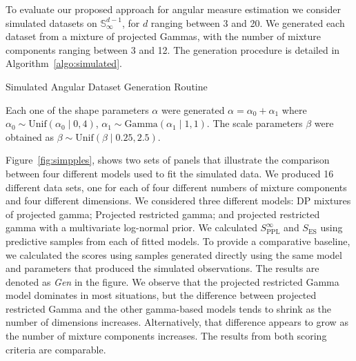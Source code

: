 To evaluate our proposed approach for angular measure estimation 
we consider simulated datasets on $\mathbb{S}_{\infty}^{d-1}$, for 
$d$ ranging between 3 and 20. We generated each dataset from a mixture of projected Gammas, with the number of mixture components
  ranging between 3 and 12.  The generation procedure is detailed in Algorithm~\ref{algo:simulated}.
  \begin{algorithm}[ht]
    \footnotesize
    \caption{Simulated Angular Dataset Generation Routine\label{algo:simulated}}
  \end{algorithm}
Each one of the shape parameters $\alpha$ were generated 
$\alpha = \alpha_0 + \alpha_1$ where
  $\alpha_0 \sim \text{Unif}(\alpha_0\mid 0,4)$, $\alpha_1\sim \text{Gamma}(\alpha_1\mid 1,1)$.
The scale parameters $\beta$ were obtained as $\beta\sim\text{Unif}(\beta\mid 0.25, 2.5)$.


Figure~\ref{fig:simpples}, shows two sets of panels that illustrate the comparison
between four different models used to fit the simulated data. We produced 16 
different data sets, one for each of four different numbers of mixture components 
and four different dimensions. We considered three different models: DP mixtures 
of projected gamma; Projected restricted gamma; and projected restricted gamma 
with a multivariate log-normal prior. We calculated $S^\infty_{\text{PPL}}$ and 
$S_{\text{ES}}$ using predictive samples from each of fitted models. To provide 
a comparative baseline, we calculated the scores using samples generated 
directly using the same model and parameters that produced the simulated 
observations. The results are denoted as \emph{Gen} in the figure. 
We observe that the projected
  restricted Gamma model dominates in most situations, but the difference between projected restricted
  Gamma and the other gamma-based models tends to shrink as the number of dimensions increases.
  Alternatively, that difference appears to grow as the number of mixture components increases. 
  The results from both scoring criteria are comparable.

